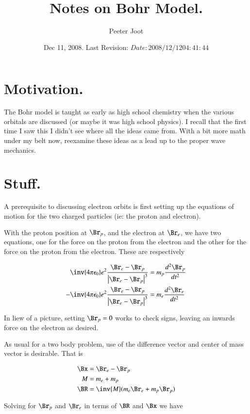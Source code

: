 \documentclass{article}
\title{ Notes on Bohr Model. }
\author{Peeter Joot}
\date{ Dec 11, 2008.  Last Revision: $Date: 2008/12/12 04:41:44 $ }
\newcommand{\K}[0]{\inv{4 \pi \epsilon_0}}
\begin{document}
\maketitle{}

\section{ Motivation. }

The Bohr model is taught as early as high school chemistry when the various orbitals are
discussed (or maybe it was high school physics).  I recall
that the first time I saw this I didn't see where all the ideas came from.
With a bit more math under my belt now, reexamine these ideas as a lead up to
the proper wave mechanics.

\section{ Stuff. }

A prerequisite to discussing electron orbits is first setting up the equations of motion
for the two charged particles (ie: the proton and electron).

With the proton position at $\Br_p$, and the electron at $\Br_e$, we have two equations, one
for the force on the proton from the electron and the other for the force on the proton from
the electron.  These are respectively

\begin{align}\label{eqn:chargeEquations}
  \K e^2 \frac { \Br_e - \Br_p } { \Abs{\Br_e - \Br_p}^3 } &= m_p \frac{d^2 \Br_p }{dt^2} \\
- \K e^2 \frac { \Br_e - \Br_p } { \Abs{\Br_e - \Br_p}^3 } &= m_e \frac{d^2 \Br_e }{dt^2}
\end{align}

In liew of a picture, setting $\Br_p = 0$ works to check signs, leaving an inwards force on the electron as desired.

As usual for a two body problem, use of the difference vector and center of mass vector is desirable.  That is

\begin{align*}
\Bx &= \Br_e - \Br_p \\
M &= m_e + m_p \\
\BR &= \inv{M}(m_e \Br_e + m_p \Br_p)
\end{align*}

Solving for $\Br_p$ and $\Br_e$ in terms of $\BR$ and $\Bx$ we have
\end{document}
